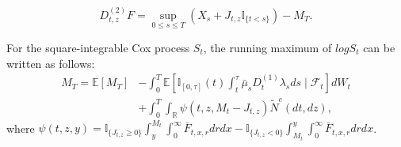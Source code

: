 \documentclass[10pt,a4paper]{amsart}
\begin{document}
\begin{equation}\label{d2cox}
D_{t, z}^{(2)} F=\sup _{0 \leq s \leq T}\left(X_{s}+J_{t,z} \mathbb{I}_{\{t<s\}}\right)-M_{T}.
\end{equation}

\begin{Theorem}
For the square-integrable Cox process $S_t$, the running maximum of $log S_t$ can be written as follows:
\begin{align*}
M_{T}=\mathbb{E}\left[M_{T}\right] &-\int_{0}^{T} \mathbb{E}\left[ \mathbb{I}_{[0, \tau]}(t)\int_t^\tau \bar{\mu}_s D_t^{(1)}\lambda_s ds\mid \mathcal{F}_{t}\right] dW_t \\
& +\int_{0}^{T} \int_{\mathbb{R}} \psi\left(t, z, M_{t}-J_{t, z}\right) \tilde{N}^c(d t, d z),
\end{align*}
where $\psi(t, z, y)=\mathbb{I}_{\{J_{t,z} \geq 0\}}\int_{y}^{M_t} \int_{0}^{\infty}\bar{F}_{t, x, r}dr d x -  \mathbb{I}_{\{J_{t,z} < 0\}}\int_{M_t}^{y} \int_{0}^{\infty}\bar{F}_{t, x, r}dr d x$.
\end{Theorem}
\end{document}
